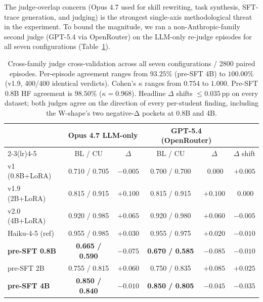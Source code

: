 \documentclass[10pt]{article}
\begin{document}
The judge-overlap concern (Opus 4.7 used for skill rewriting, task synthesis, SFT-trace generation, and judging) is the strongest single-axis methodological threat in the experiment. To bound the magnitude, we ran a non-Anthropic-family second judge (GPT-5.4 via OpenRouter) on the LLM-only re-judge episodes for all seven configurations (Table~\ref{tab:cross-family}).

\begin{table}[h]
\centering
\small
\begin{tabular}{@{}l c c c c c@{}}
\toprule
& \multicolumn{2}{c}{\textbf{Opus 4.7 LLM-only}} & \multicolumn{2}{c}{\textbf{GPT-5.4 (OpenRouter)}} & \\
\cmidrule(lr){2-3}\cmidrule(lr){4-5}
& BL / CU & $\Delta$ & BL / CU & $\Delta$ & $\Delta$ shift \\
\midrule
v1   (0.8B+LoRA)        & 0.710 / 0.705 & $-0.005$ & 0.700 / 0.700 & $\;0.000$ & $+0.005$ \\
v1.9 (2B+LoRA)          & 0.815 / 0.915 & $+0.100$ & 0.815 / 0.915 & $+0.100$ & $\;0.000$ \\
v2.0 (4B+LoRA)          & 0.920 / 0.985 & $+0.065$ & 0.920 / 0.980 & $+0.060$ & $-0.005$ \\
Haiku-4-5 (ref)         & 0.955 / 0.985 & $+0.030$ & 0.955 / 0.975 & $+0.020$ & $-0.010$ \\
\textbf{pre-SFT 0.8B}   & \textbf{0.665 / 0.590} & $\boldsymbol{-0.075}$ & \textbf{0.670 / 0.585} & $\boldsymbol{-0.085}$ & $-0.010$ \\
pre-SFT 2B              & 0.755 / 0.815 & $+0.060$ & 0.750 / 0.835 & $+0.085$ & $+0.025$ \\
\textbf{pre-SFT 4B}     & \textbf{0.850 / 0.840} & $\boldsymbol{-0.010}$ & \textbf{0.850 / 0.805} & $\boldsymbol{-0.045}$ & $\boldsymbol{-0.035}$ \\
\bottomrule
\end{tabular}
\caption{Cross-family judge cross-validation across all seven configurations / 2800 paired episodes. Per-episode agreement ranges from $93.25\%$ (pre-SFT 4B) to $100.00\%$ (v1.9, 400/400 identical verdicts). Cohen's $\kappa$ ranges from $0.754$ to $1.000$. Pre-SFT 0.8B HF agreement is $98.50\%$ ($\kappa = 0.968$). Headline $\Delta$ shifts $\leq 0.035$\,pp on every dataset; both judges agree on the direction of every per-student finding, including the W-shape's two negative-Δ pockets at 0.8B and 4B.}
\label{tab:cross-family}
\end{table}
\end{document}
